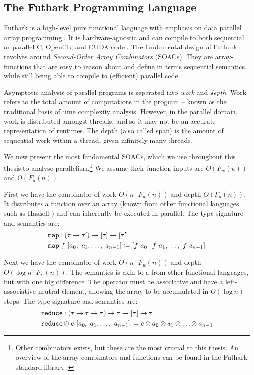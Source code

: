 \subsection{The Futhark Programming Language}
\label{subsec:futhark}

Futhark is a high-level pure functional language with emphasis on data parallel
array programming
\cite{ParallelProgrammingInFuthark,Henriksen:2017:FPF:3062341.3062354}. It is
hardware-agnostic and can compile to both sequential or parallel C, OpenCL, and
CUDA code \cite{futguide}. The fundamental design of Futhark revolves around
\textit{Second-Order Array Combinators} (SOACs). They are array-functions that
are easy to reason about and define in terms sequential semantics, while still
being able to compile to (efficient) parallel code.

Asymptotic analysis of parallel programs is separated into \textit{work}
and \textit{depth}. Work refers to the total amount of computations in the
program -- known as the traditional basis of time complexity analysis. However,
in the parallel domain, work is distributed amongst threads, and so it may not
be an accurate representation of runtimes. The depth (also called span) is the
amount of sequential work within a thread, given infinitely many threads.

We now present the most fundamental SOACs, which we use throughout this thesis
to analyse parallelism.\footnote{Other combinators exists, but these are the
  most crucial to this thesis. An overview of the array combinators and
  functions can be found in the Futhark standard library \cite{futprelude}.} We
assume their function inputs are $O(F_{w}(n))$ and $O(F_d(n))$.

First we have the combinator  of work $O(n\cdot F_w(n))$ and depth
$O(F_d(n))$. It distributes a function over an array (known from other
functional languages such as Haskell \cite{marlow2010haskell}) and can
inherently be executed in parallel. The type signature and semantics are:
\begin{align}
  &\mathtt{map}:(\tau \to \tau') \to \mathtt{[}\tau\mathtt{]} \to \mathtt{[}\tau'\mathtt{]}\\
  &\mathtt{map}~f~[a_0,~a_1,\ldots,~a_{n-1}] \coloneq [f~a_0,~f~a_1,\ldots,~f~a_{n-1}]
\end{align}

Next we have the combinator  of work $O(n\cdot F_w(n))$ and depth
$O(\log n \cdot F_w(n))$.  The semantics is akin to a  from other
functional languages, but with one big difference: The operator must be
associative and have a left-associative neutral element, allowing the array to
be accumulated in $O(\log n)$ steps. The type signature and semantics are:
\begin{align}
  &\mathtt{reduce}:(\tau \to \tau \to \tau) \to \tau \to \mathtt{[}\tau\mathtt{]} \to \tau\\
  & \mathtt{reduce} \oslash e~[a_0,~a_1,\ldots,~a_{n-1}] \coloneq e \oslash a_0 \oslash a_1 \oslash \ldots\oslash a_{n-1}
\end{align}

